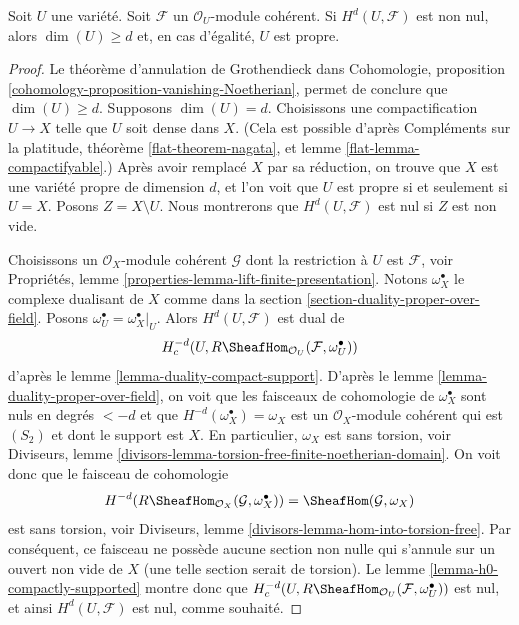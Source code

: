 \begin{lemma}
\label{lemma-lichtenbaum}
Soit $U$ une variété. Soit $\mathcal{F}$ un $\mathcal{O}_U$-module cohérent. Si $H^d(U, \mathcal{F})$ est non nul, alors $\dim(U) \geq d$ et, en cas d'égalité, $U$ est propre.
\end{lemma}

\begin{proof}
Le théorème d'annulation de Grothendieck dans Cohomologie, proposition \ref{cohomology-proposition-vanishing-Noetherian}, permet de conclure que $\dim(U) \geq d$. Supposons $\dim(U) = d$. Choisissons une compactification $U \to X$ telle que $U$ soit dense dans $X$. (Cela est possible d'après Compléments sur la platitude, théorème \ref{flat-theorem-nagata}, et lemme \ref{flat-lemma-compactifyable}.) Après avoir remplacé $X$ par sa réduction, on trouve que $X$ est une variété propre de dimension $d$, et l'on voit que $U$ est propre si et seulement si $U = X$. Posons $Z = X \setminus U$. Nous montrerons que $H^d(U, \mathcal{F})$ est nul si $Z$ est non vide.

\medskip\noindent
Choisissons un $\mathcal{O}_X$-module cohérent $\mathcal{G}$ dont la restriction à $U$ est $\mathcal{F}$, voir Propriétés, lemme \ref{properties-lemma-lift-finite-presentation}. Notons $\omega_X^\bullet$ le complexe dualisant de $X$ comme dans la section \ref{section-duality-proper-over-field}. Posons $\omega_U^\bullet = \omega_X^\bullet|_U$. Alors $H^d(U, \mathcal{F})$ est dual de
$$
H^{-d}_c(U, R\SheafHom_{\mathcal{O}_U}(\mathcal{F}, \omega_U^\bullet))
$$
d'après le lemme \ref{lemma-duality-compact-support}. D'après le lemme \ref{lemma-duality-proper-over-field}, on voit que les faisceaux de cohomologie de $\omega_X^\bullet$ sont nuls en degrés $< -d$ et que $H^{-d}(\omega_X^\bullet) = \omega_X$ est un $\mathcal{O}_X$-module cohérent qui est $(S_2)$ et dont le support est $X$. En particulier, $\omega_X$ est sans torsion, voir Diviseurs, lemme \ref{divisors-lemma-torsion-free-finite-noetherian-domain}. On voit donc que le faisceau de cohomologie
$$
H^{-d}(R\SheafHom_{\mathcal{O}_X}(\mathcal{G}, \omega_X^\bullet)) =
\SheafHom(\mathcal{G}, \omega_X)
$$
est sans torsion, voir Diviseurs, lemme \ref{divisors-lemma-hom-into-torsion-free}. Par conséquent, ce faisceau ne possède aucune section non nulle qui s'annule sur un ouvert non vide de $X$ (une telle section serait de torsion). Le lemme \ref{lemma-h0-compactly-supported} montre donc que
$H^{-d}_c(U, R\SheafHom_{\mathcal{O}_U}(\mathcal{F}, \omega_U^\bullet))$
est nul, et ainsi $H^d(U, \mathcal{F})$ est nul, comme souhaité.
\end{proof}

